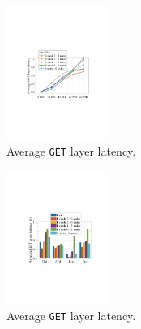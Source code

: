 %


\begin{figure}[t]
	\centering
	\includegraphics[width=0.3\textwidth]{graphs/dalprimary.pdf}
	\caption{Average \texttt{GET} layer latency.}
	\label{fig:eval-dalprimary}
	
\end{figure}

\begin{figure}[t]
	\centering
	\includegraphics[width=0.3\textwidth]{graphs/total-traces.pdf}
	\caption{Average \texttt{GET} layer latency. }
	\label{fig:eval-total-traces}
	
\end{figure}
